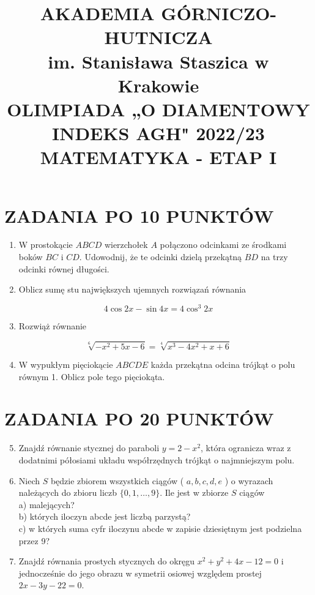\documentclass[10pt]{article}
\title{AKADEMIA GÓRNICZO-HUTNICZA \\
 im. Stanisława Staszica w Krakowie \\
 OLIMPIADA „O DIAMENTOWY INDEKS AGH" 2022/23 \\
 MATEMATYKA - ETAP I }
\author{}
\date{}
\begin{document}
\maketitle
\section*{ZADANIA PO 10 PUNKTÓW}
\begin{enumerate}
  \item W prostokącie $A B C D$ wierzchołek $A$ połączono odcinkami ze środkami boków $B C$ i $C D$. Udowodnij, że te odcinki dzielą przekątną $B D$ na trzy odcinki równej długości.
  \item Oblicz sumę stu największych ujemnych rozwiązań równania
\end{enumerate}

$$
4 \cos 2 x-\sin 4 x=4 \cos ^{3} 2 x
$$

\begin{enumerate}
  \setcounter{enumi}{2}
  \item Rozwiąż równanie
\end{enumerate}

$$
\sqrt[6]{-x^{2}+5 x-6}=\sqrt[4]{x^{3}-4 x^{2}+x+6}
$$

\begin{enumerate}
  \setcounter{enumi}{3}
  \item W wypukłym pięciokącie $A B C D E$ każda przekątna odcina trójkąt o polu równym 1. Oblicz pole tego pięciokąta.
\end{enumerate}

\section*{ZADANIA PO 20 PUNKTÓW}
\begin{enumerate}
  \setcounter{enumi}{4}
  \item Znajdź równanie stycznej do paraboli $y=2-x^{2}$, która ogranicza wraz z dodatnimi półosiami układu współrzędnych trójkąt o najmniejszym polu.
  \item Niech $S$ będzie zbiorem wszystkich ciągów ( $a, b, c, d, e$ ) o wyrazach należących do zbioru liczb $\{0,1, \ldots, 9\}$. Ile jest w zbiorze $S$ ciągów\\
a) malejących?\\
b) których iloczyn abcde jest liczbą parzystą?\\
c) w których suma cyfr iloczynu abcde w zapisie dziesiętnym jest podzielna przez 9?
  \item Znajdź równania prostych stycznych do okręgu $x^{2}+y^{2}+4 x-12=0$ i jednocześnie do jego obrazu w symetrii osiowej względem prostej $2 x-3 y-22=0$.
\end{enumerate}
\end{document}
